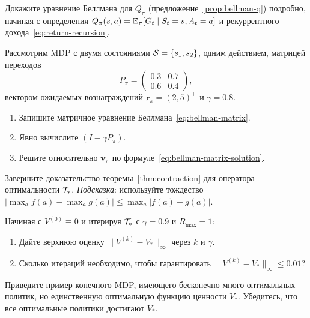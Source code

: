 \begin{exercise}
\label{ex:bellman-q-proof}
Докажите уравнение Беллмана для $Q_\pi$ (предложение~\ref{prop:bellman-q}) подробно, начиная с определения $Q_\pi(s,a) = \operatorname{\mathbb{E}}_\pi[G_t \mid S_t = s, A_t = a]$ и рекуррентного дохода~\eqref{eq:return-recursion}.
\end{exercise}

\begin{exercise}
\label{ex:matrix-bellman}
Рассмотрим MDP с двумя состояниями $\mathcal{S} = \{s_1, s_2\}$, одним действием, матрицей переходов
\[
P_\pi = \begin{pmatrix} 0.3 & 0.7 \\ 0.6 & 0.4 \end{pmatrix},
\]
вектором ожидаемых вознаграждений $\mathbf{r}_\pi = (2, 5)^\top$ и $\gamma = 0.8$.
\begin{enumerate}[label=(\alph*)]
  \item Запишите матричное уравнение Беллмана~\eqref{eq:bellman-matrix}.
  \item Явно вычислите $(I - \gamma P_\pi)$.
  \item Решите относительно $\mathbf{v}_\pi$ по формуле~\eqref{eq:bellman-matrix-solution}.
\end{enumerate}
\end{exercise}

\begin{exercise}
\label{ex:contraction-star}
Завершите доказательство теоремы~\ref{thm:contraction} для оператора оптимальности $\mathcal{T}_*$. \emph{Подсказка}: используйте тождество $|\max_a f(a) - \max_a g(a)| \le \max_a |f(a) - g(a)|$.
\end{exercise}

\begin{exercise}
\label{ex:convergence-rate}
Начиная с $V^{(0)} \equiv 0$ и итерируя $\mathcal{T}_*$ с $\gamma = 0.9$ и $R_{\max} = 1$:
\begin{enumerate}[label=(\alph*)]
  \item Дайте верхнюю оценку $\|V^{(k)} - V_*\|_\infty$ через $k$ и $\gamma$.
  \item Сколько итераций необходимо, чтобы гарантировать $\|V^{(k)} - V_*\|_\infty \le 0.01$?
\end{enumerate}
\end{exercise}

\begin{exercise}
\label{ex:optimal-policy-unique}
Приведите пример конечного MDP, имеющего бесконечно много оптимальных политик, но единственную оптимальную функцию ценности $V_*$. Убедитесь, что все оптимальные политики достигают $V_*$.
\end{exercise}


